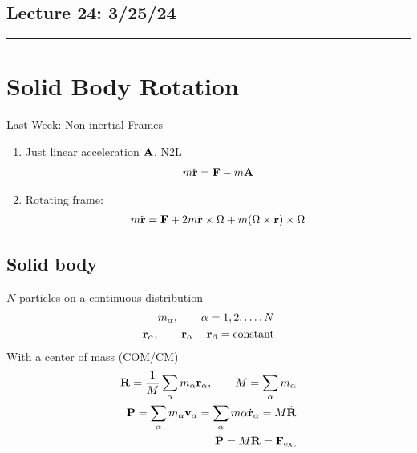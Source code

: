 \documentclass[../main.tex]{subfiles}
\begin{document}
\subsection*{Lecture 24: \hfill  3/25/24}
\hrule \vspace{10px}
\section*{Solid Body Rotation}

Last Week: Non-inertial Frames
\begin{enumerate}
    \item Just linear acceleration $\vb A$, N2L 
    \begin{align*}
        m \ddot{\vb r} = \vb F - m \vb A
    \end{align*}
    \item Rotating frame: 
    \begin{align*}
        m\ddot{\vb r} = \vb F + 2m\dot{\vb r} \times \Omega + m(\Omega \times \vb r) \times \Omega
    \end{align*}
\end{enumerate}

\subsection*{Solid body} $N$ particles on a continuous distribution
\begin{align*}
    m_\alpha, \qquad \alpha = 1, 2, \dots, N \\
    \vb r_\alpha, \qquad \vb r_\alpha - \vb r_\beta = \text{constant}
\end{align*}
With a center of mass (COM/CM)
\begin{align*}
    \vb R = \frac{1}{M} \sum_\alpha m_\alpha \vb r_\alpha, \qquad M = \sum_\alpha m_\alpha \\
    \vb P = \sum_\alpha m_\alpha \vb v_\alpha = \sum_\alpha m\alpha \dot{\vb r}_\alpha = M \dot{\vb R} \\
    \dot{\vb P} = M \ddot{\vb R} = \vb F_{\text{ext}} 
\end{align*}
\end{document}
